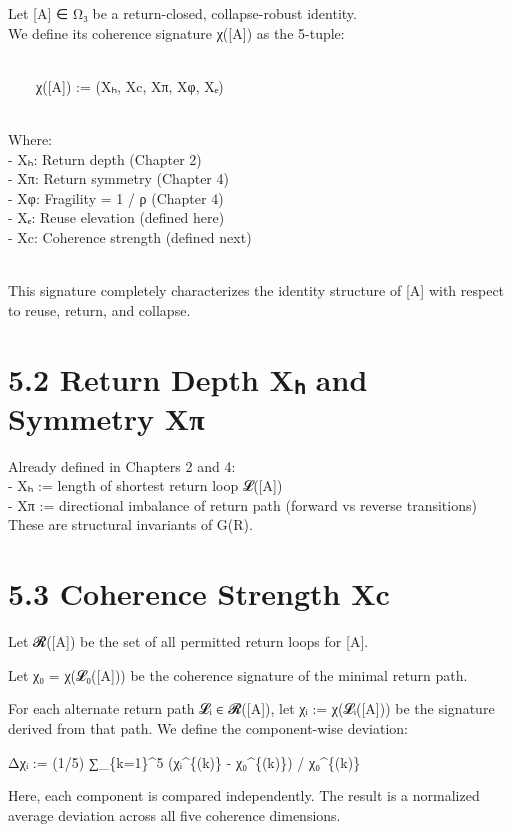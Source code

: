 Let {[}A{]} ∈ Ω₃ be a return-closed, collapse-robust identity.\\
We define its coherence signature χ({[}A{]}) as the 5-tuple:\\
\strut \\
  χ({[}A{]}) := (Xₕ, Xc, Xπ, Xφ, Xₑ)\\
\strut \\
Where:\\
- Xₕ: Return depth (Chapter 2)\\
- Xπ: Return symmetry (Chapter 4)\\
- Xφ: Fragility = 1 / ρ (Chapter 4)\\
- Xₑ: Reuse elevation (defined here)\\
- Xc: Coherence strength (defined next)\\
\strut \\
This signature completely characterizes the identity structure of
{[}A{]} with respect to reuse, return, and collapse.

\section{5.2 \textbar{} Return Depth Xₕ and Symmetry
Xπ}\label{return-depth-xux2095-and-symmetry-xux3c0}

Already defined in Chapters 2 and 4:\\
- Xₕ := length of shortest return loop 𝓛({[}A{]})\\
- Xπ := directional imbalance of return path (forward vs reverse
transitions)\\
These are structural invariants of G(R).

\section{5.3 \textbar{} Coherence Strength
Xc}\label{coherence-strength-xc}

Let 𝓡({[}A{]}) be the set of all permitted return loops for {[}A{]}.

Let χ₀ = χ(𝓛₀({[}A{]})) be the coherence signature of the minimal return
path.

For each alternate return path 𝓛ᵢ ∈ 𝓡({[}A{]}), let χᵢ := χ(𝓛ᵢ({[}A{]}))
be the signature derived from that path. We define the component-wise
deviation:

Δχᵢ := (1/5) ∑\_\{k=1\}\^{}5 \textbar(χᵢ\^{}\{(k)\} - χ₀\^{}\{(k)\}) /
χ₀\^{}\{(k)\}\textbar{}

Here, each component is compared independently. The result is a
normalized average deviation across all five coherence dimensions.

